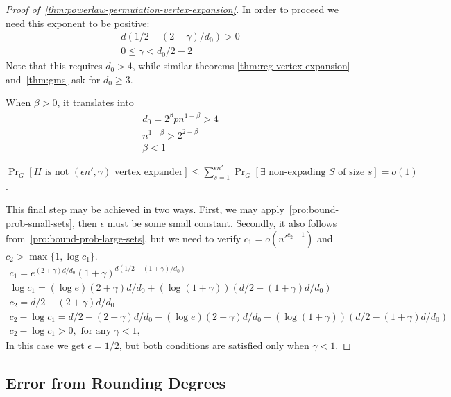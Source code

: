 \begin{proof}[Proof of~\autoref{thm:powerlaw-permutation-vertex-expansion}]
    In order to proceed we need this exponent to be positive:
    \begin{gather}
        d(1/2-(2+\gamma)/d_0)>0\\
        0\leq\gamma<d_0/2-2
    \end{gather}
    Note that this requires $d_0>4$, while similar theorems
    \ref{thm:reg-vertex-expansion} and~\ref{thm:gms} ask for $d_0\geq 3$.
    
    When $\beta>0$, it translates into
    \begin{gather}
        d_0=2^\beta pn^{1-\beta}>4\\
        n^{1-\beta}>2^{2-\beta}\\
        \beta<1
    \end{gather}
    
    $\Pr_G[H\text{ is not }(\epsilon n',\gamma)\text{ vertex expander}]
    \leq\sum_{s=1}^{\epsilon n'}{\Pr_G[\exists\text{ non-expading }S\text{ of size }s]}=o(1)$.
    
    This final step may be achieved in two ways.
    First, we may apply~\autoref{pro:bound-prob-small-sets},
    then $\epsilon$ must be some small constant.
    Secondly, it also follows from~\autoref{pro:bound-prob-large-sets}, but we
    need to verify $c_1=o\left(n'^{c_2-1}\right)$ and $c_2>\max\{1,\log c_1\}$.
    \begin{gather*}
        c_1=e^{(2+\gamma)d/d_0}(1+\gamma)^{d(1/2-(1+\gamma)/d_0)}\\
        \log c_1=(\log e)(2+\gamma)d/d_0+(\log(1+\gamma))(d/2-(1+\gamma)d/d_0)\\
        c_2=d/2-(2+\gamma)d/d_0\\
        c_2-\log c_1=
        d/2-(2+\gamma)d/d_0
        -(\log e)(2+\gamma)d/d_0
        -(\log(1+\gamma))(d/2-(1+\gamma)d/d_0)\\
        c_2-\log c_1>0,\text{ for any }\gamma<1,
    \end{gather*}
    In this case we get $\epsilon=1/2$, but both conditions
    are satisfied only when $\gamma<1$.
\end{proof}

\subsection{Error from Rounding Degrees}
\label{subsec:powerlaw-permutation-rounding-error}

